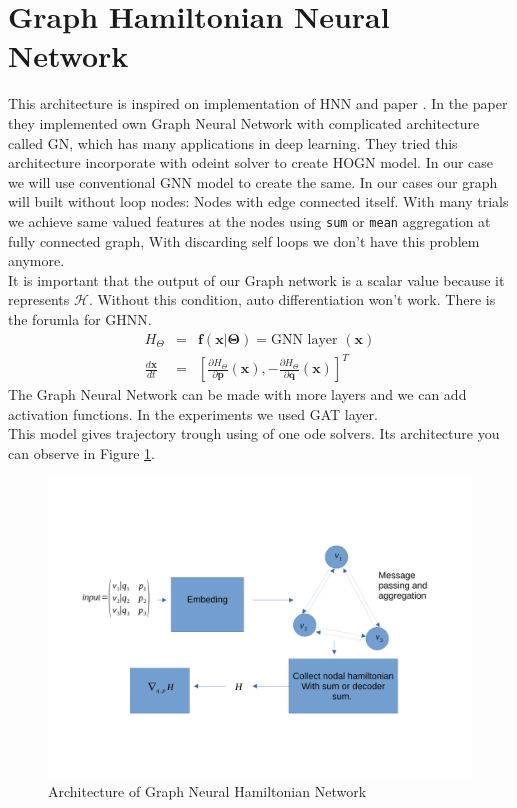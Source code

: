 \section{Graph Hamiltonian Neural Network}
This architecture is inspired on implementation of HNN\cite{hnn} and paper \cite{GNNODE}. In the paper they implemented own Graph Neural Network with complicated architecture called GN, which has many applications in deep learning.  They tried this architecture incorporate with odeint solver to create HOGN model.
In our case we will use conventional GNN model to create the same.
In our cases our graph will built without loop nodes: Nodes with edge connected itself. With many trials we achieve same valued features at the nodes using \texttt{sum} or \texttt{mean} aggregation at fully connected graph, With discarding self loops we don't have this problem anymore.\\  It is important that the output of our Graph network is a scalar value because it represents $\mathcal{H}$. Without this condition, auto differentiation won't work. 
There is the forumla for GHNN.
\begin{eqnarray}
	H_{\Theta} &=& \mathbf{f}(\mathbf{x}|\boldsymbol{\Theta})=\text{GNN layer }(\mathbf{x})\\
	\frac{d\mathbf{x}}{dt} &=& \left[\frac{\partial H_{\Theta}}{\partial\mathbf{p}}(\mathbf{x}),-\frac{\partial H_{\Theta}}{\partial\mathbf{q}}(\mathbf{x})\right]^T
\end{eqnarray}
The Graph Neural Network can be made with more layers and we can add activation functions. In the experiments we used GAT layer.\\
This model gives trajectory trough using of one ode solvers. Its architecture you can observe in Figure \ref{ghnn}.
\begin{figure}[h!]
	\includegraphics[width=15cm]{chapters/chapter4/ghnn}
	\caption{Architecture of Graph Neural Hamiltonian Network}
	\label{ghnn}
\end{figure}
